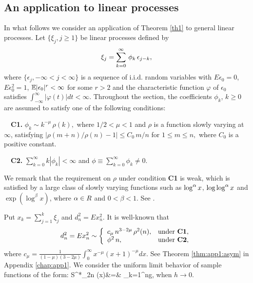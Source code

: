\subsection{An application to linear processes}
In what follows we consider an  application of Theorem \ref {th1} to general linear processes.
Let $\{\xi _{j},j\geq 1\}$ be linear processes defined by
\begin{equation}
\xi _{j}=\sum_{k=0}^{\infty }\,\phi _{k}\,\epsilon _{j-k}, \la {eqn:3:f1}
\end{equation}
where $\{\epsilon _{j},-\infty <j<\infty \}$ is a sequence of i.i.d.
random variables with $E\epsilon _{0}=0$, $E\epsilon _{0}^{2}=1$, $\mathbb E|\epsilon_0|^r < \infty$ for some $r > 2$ and the
characteristic function $\varphi $ of $\epsilon _{0}$ satisfies
$\int_{-\infty
}^{\infty }|\varphi (t)|dt<\infty $. Throughout the section, the coefficients $\phi_k$, $k \ge 0$ are assumed to satisfy one of the following conditions:

\noindent
\ \ \textbf{C1.} $\phi _{k}\sim k^{-\mu }\,\rho(k),$ where $1/2<\mu <1$ and $
\rho$ is a function slowly varying at $\infty $, satisfying
$
|\rho(m+n)/\rho(n)-1| \le C_0\, m/n$ for $1\le m\le n,$
where $C_0$ is a positive constant.

\noindent
\ \ \textbf{C2.} $\sum_{k=0}^{\infty }k |\phi _{k}|<\infty $ and $\phi \equiv
\sum_{k=0}^{\infty }\phi_{k}\not =0$.

\noindent We remark that the requirement on $\rho$ under condition {\bf C1} is weak,
which is satisfied by a large class of slowly varying functions such as $\log^{\alpha}x$,
$\log\log^{\alpha}x$ and $\exp(\log ^{\beta}x)$, where $\alpha\in R$ and $0<\beta<1$. See \cite{wanglingulati2003a}.

Put $x_{k}=\sum_{j=1}^{k}\xi _{j}$ and $d_n^2=Ex_n^2$.
It is well-known that
 \begin{equation}
 d_n^2=Ex_{n}^{2}\sim \left\{
\begin{array}{ll}
c_{\mu }\,n^{3-2\mu }\,\rho ^{2}(n), & \mbox{under {\bf C1}}, \\
\phi ^{2}\,n, & \mbox{under {\bf C2},}%
\end{array}%
\right. \la {ni1}
\end{equation}
where   $c_{\mu
}=\frac{1}{(1-\mu )(3-2\mu )}\int_{0}^{\infty }x^{-\mu }(x+1)^{-\mu
}dx$.
See Theorem \ref{thm:app1:asym} in Appendix \ref{chap:app1}. We consider the uniform limit behavior of sample functions of the form:
 \be
S^*_{2n} (x)&=&  \sum_{k=1}^{n}g\big[h^{-1}\,(x_{k}+x\, d_n)
\big],
\ee when $h\to 0$.  

